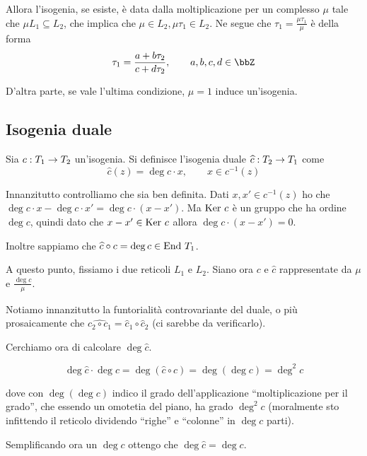 	Allora l'isogenia, se esiste, è data dalla moltiplicazione per un complesso $\mu$ tale che $\mu L_1 \subseteq L_2$, che implica che $\mu \in L_2, \mu\tau_1 \in L_2$. Ne segue che $\tau_1 = \frac{\mu\tau_1}{\mu}$ è della forma 
	\[
		\tau_1 = \frac{a + b\tau_2}{c+d\tau_2}, \qquad a,b,c,d \in \bbZ
	\]
	
	D'altra parte, se vale l'ultima condizione, $\mu=1$ induce un'isogenia.

	\subsection{Isogenia duale}
	
	Sia $c: T_1 \rightarrow T_2$ un'isogenia. Si definisce l'isogenia duale $\widehat c: T_2 \rightarrow T_1$ come 
	\[
		\hat c(z) = \deg c\cdot x, \qquad x \in c^{-1}(z)
	\]
	
	Innanzitutto controlliamo che sia ben definita. Dati $x, x' \in c^{-1}(z)$ ho che $\deg c \cdot x - \deg c \cdot x' = \deg c \cdot (x-x')$. Ma $\mbox{Ker } c$ è un gruppo che ha ordine $\deg c$, quindi dato che $x-x' \in \mbox{Ker } c$ allora $\deg c \cdot (x-x') = 0$.
	
	Inoltre sappiamo che $\widehat c \circ c = \deg c \in \mbox{End } T_1$.
	
	A questo punto, fissiamo i due reticoli $L_1$ e $L_2$. Siano ora $c$ e $\hat c$ rappresentate da $\mu$ e $\frac{\deg c}\mu$.
	
	Notiamo innanzitutto la funtorialità controvariante del duale, o più prosaicamente che $\hat{c_2 \circ c_1} = \hat c_1 \circ \hat c_2$ (ci sarebbe da verificarlo).

	Cerchiamo ora di calcolare $\deg \hat c$.
	
	\[
		\deg \hat c \cdot \deg c = \deg(\hat c \circ c) = \deg(\deg c) = \deg^2 c
	\]
	
	dove con $\deg(\deg c)$ indico il grado dell'applicazione ``moltiplicazione per il grado'', che essendo un omotetia del piano, ha grado $\deg^2 c$ (moralmente sto infittendo il reticolo dividendo ``righe'' e ``colonne'' in $\deg c$ parti).
	
	Semplificando ora un $\deg c$ ottengo che $\deg \hat c = \deg c$.

